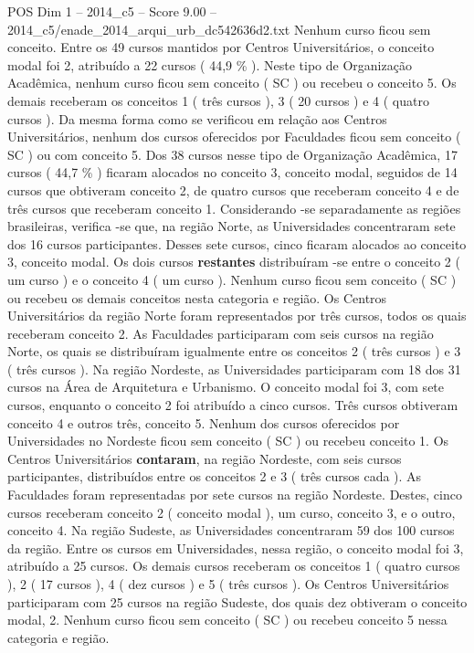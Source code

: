 \begin{textsample}{POS Dim 1 – 2014\_c5 – Score 9.00 – 2014\_c5/enade\_2014\_arqui\_urb\_dc542636d2.txt}
Nenhum curso ficou sem conceito.
Entre os 49 cursos mantidos por Centros Universitários, o conceito modal foi 2, atribuído a 22 cursos ( 44,9 \% ).
Neste tipo de Organização Acadêmica, nenhum curso ficou sem conceito ( SC ) ou recebeu o conceito 5.
Os demais receberam os conceitos 1 ( três cursos ), 3 ( 20 cursos ) e 4 ( quatro cursos ).
Da mesma forma como se verificou em relação aos Centros Universitários, nenhum dos cursos oferecidos por Faculdades ficou sem conceito ( SC ) ou com conceito 5.
Dos 38 cursos nesse tipo de Organização Acadêmica, 17 cursos ( 44,7 \% ) ficaram alocados no conceito 3, conceito modal, seguidos de 14 cursos que obtiveram conceito 2, de quatro cursos que receberam conceito 4 e de três cursos que receberam conceito 1.
Considerando -se separadamente as regiões brasileiras, verifica -se que, na região Norte, as Universidades concentraram sete dos 16 cursos participantes.
Desses sete cursos, cinco ficaram alocados ao conceito 3, conceito modal.
Os dois cursos \textbf{restantes} distribuíram -se entre o conceito 2 ( um curso ) e o conceito 4 ( um curso ).
Nenhum curso ficou sem conceito ( SC ) ou recebeu os demais conceitos nesta categoria e região.
Os Centros Universitários da região Norte foram representados por três cursos, todos os quais receberam conceito 2.
As Faculdades participaram com seis cursos na região Norte, os quais se distribuíram igualmente entre os conceitos 2 ( três cursos ) e 3 ( três cursos ).
Na região Nordeste, as Universidades participaram com 18 dos 31 cursos na Área de Arquitetura e Urbanismo.
O conceito modal foi 3, com sete cursos, enquanto o conceito 2 foi atribuído a cinco cursos.
Três cursos obtiveram conceito 4 e outros três, conceito 5.
Nenhum dos cursos oferecidos por Universidades no Nordeste ficou sem conceito ( SC ) ou recebeu conceito 1.
Os Centros Universitários \textbf{contaram}, na região Nordeste, com seis cursos participantes, distribuídos entre os conceitos 2 e 3 ( três cursos cada ).
As Faculdades foram representadas por sete cursos na região Nordeste.
Destes, cinco cursos receberam conceito 2 ( conceito modal ), um curso, conceito 3, e o outro, conceito 4.
Na região Sudeste, as Universidades concentraram 59 dos 100 cursos da região.
Entre os cursos em Universidades, nessa região, o conceito modal foi 3, atribuído a 25 cursos.
Os demais cursos receberam os conceitos 1 ( quatro cursos ), 2 ( 17 cursos ), 4 ( dez cursos ) e 5 ( três cursos ).
Os Centros Universitários participaram com 25 cursos na região Sudeste, dos quais dez obtiveram o conceito modal, 2.
Nenhum curso ficou sem conceito ( SC ) ou recebeu conceito 5 nessa categoria e região.

\end{textsample}
